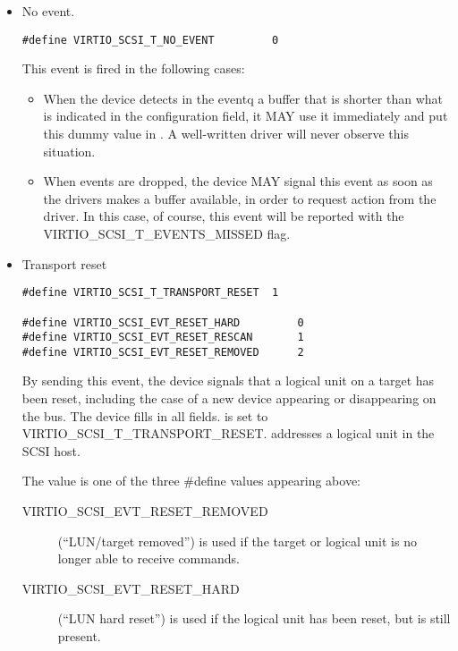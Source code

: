 \begin{itemize}
\item No event.
\begin{lstlisting}
#define VIRTIO_SCSI_T_NO_EVENT         0
\end{lstlisting}

  This event is fired in the following cases:

\begin{itemize}
\item When the device detects in the eventq a buffer that is
    shorter than what is indicated in the configuration field, it
    MAY use it immediately and put this dummy value in .
    A well-written driver will never observe this
    situation.

\item When events are dropped, the device MAY signal this event as
    soon as the drivers makes a buffer available, in order to
    request action from the driver. In this case, of course, this
    event will be reported with the VIRTIO_SCSI_T_EVENTS_MISSED
    flag.
\end{itemize}

\item Transport reset
\begin{lstlisting}
#define VIRTIO_SCSI_T_TRANSPORT_RESET  1

#define VIRTIO_SCSI_EVT_RESET_HARD         0
#define VIRTIO_SCSI_EVT_RESET_RESCAN       1
#define VIRTIO_SCSI_EVT_RESET_REMOVED      2
\end{lstlisting}

  By sending this event, the device signals that a logical unit
  on a target has been reset, including the case of a new device
  appearing or disappearing on the bus. The device fills in all
  fields.  is set to
  VIRTIO_SCSI_T_TRANSPORT_RESET.  addresses a
  logical unit in the SCSI host.

  The  value is one of the three \#define values appearing
  above:

  \begin{description}
  \item[VIRTIO_SCSI_EVT_RESET_REMOVED] (``LUN/target removed'') is used
    if the target or logical unit is no longer able to receive
    commands.

  \item[VIRTIO_SCSI_EVT_RESET_HARD] (``LUN hard reset'') is used if the
    logical unit has been reset, but is still present.


\end{description}
\end{itemize}
